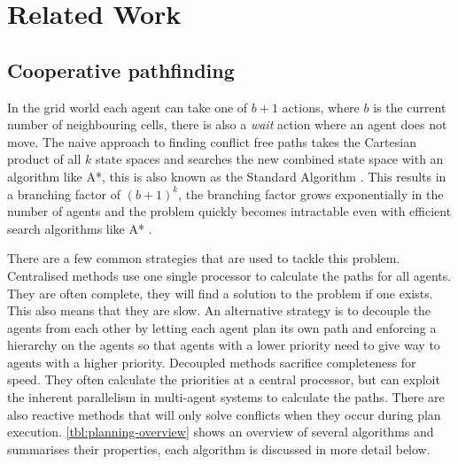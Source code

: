 \section{Related Work}\label{sec:related}

\subsection{Cooperative pathfinding}
In the grid world each agent can take one of $b+1$ actions, where $b$ is the
current number of neighbouring cells, there is also a \textit{wait} action
where an agent does not move. The naive approach to finding conflict free paths
takes the Cartesian product of all $k$ state spaces and searches the new
combined state space with an algorithm like A*, this is also known as the
Standard Algorithm \cite{standley2010}. This results in a branching factor of
$(b+1)^k$, the branching factor grows exponentially in the number of agents and
the problem quickly becomes intractable even with efficient search algorithms
like A* \cite{sharon2013}.

There are a few common strategies that are used to tackle this problem.
Centralised methods use one single processor to calculate the paths for all
agents. They are often complete, they will find a solution to the problem if
one exists. This also means that they are slow. An alternative strategy is to
decouple the agents from each other by letting each
agent plan its own path and enforcing a hierarchy on the agents so that agents
with a lower priority need to give way to agents with a higher priority.
Decoupled methods sacrifice completeness for speed. They often calculate the
priorities at a central processor, but can exploit the inherent parallelism in
multi-agent systems to calculate the paths. There are also reactive methods
that will only solve conflicts when they occur during plan execution.
\autoref{tbl:planning-overview} shows an overview of several algorithms and
summarises their properties, each algorithm is discussed in more detail below.

